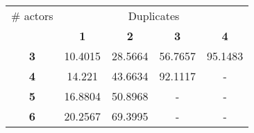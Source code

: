\begin{tabular}{ | c | c | c | c | c | }
\hline
\# actors & \multicolumn{4}{|c|}{Duplicates} \\ \cline{2-5}
 & {\bf1} & {\bf2} & {\bf3} & {\bf4} \\ \hline
{\bf 3} & 10.4015 & 28.5664 & 56.7657 & 95.1483 \\ \hline
{\bf 4} & 14.221 & 43.6634 & 92.1117 & - \\ \hline
{\bf 5} & 16.8804 & 50.8968 & - & - \\ \hline
{\bf 6} & 20.2567 & 69.3995 & - & - \\ \hline
\end{tabular}
